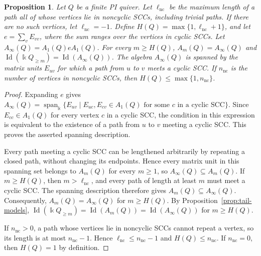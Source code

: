 \documentclass[11pt,reqno]{amsart}
\newcommand{\kk}{\Bbbk}
\newcommand{\Id}{\operatorname{Id}}
\newtheorem{proposition}[theorem]{Proposition}
\theoremstyle{definition}
\theoremstyle{remark}
\numberwithin{equation}{section}
\begin{document}
\begin{proposition}\label{prop:tail-stabilization}
Let $Q$ be a finite PI quiver. Let $\ell_{\mathrm{nc}}$ be the maximum
length of a path all of whose vertices lie in noncyclic SCCs,
including trivial paths. If there are no such vertices, let
$\ell_{\mathrm{nc}}=-1$. Define
$H(Q)=\max\{1,\ell_{\mathrm{nc}}+1\}$, and let
$e=\sum_{v}E_{vv}$, where the sum ranges over the vertices in cyclic
SCCs. Let $A_\infty(Q)=A_1(Q)eA_1(Q)$. For every $m\ge H(Q)$,
$
 A_m(Q)=A_\infty(Q)$ and $
 \Id(\kk Q_{\ge m})=\Id(A_\infty(Q))$.
The algebra $A_\infty(Q)$ is spanned by the matrix units $E_{uv}$
for which a path from $u$ to $v$ meets a cyclic SCC.
If $n_{\mathrm{nc}}$ is the number of vertices in noncyclic SCCs,
then $H(Q)\le\max\{1,n_{\mathrm{nc}}\}$.
\end{proposition}

\begin{proof}

Expanding $e$ gives
$
A_\infty(Q)=\operatorname{span}_{\kk}
\{E_{uv}\mid E_{uc},E_{cv}\in A_1(Q)
\text{ for some }c\text{ in a cyclic SCC}\}.
$
Since $E_{cc}\in A_1(Q)$ for every vertex $c$ in a cyclic SCC,
the condition in this expression is equivalent to the existence
of a path from $u$ to $v$ meeting a cyclic SCC.
This proves the asserted spanning description.


Every path meeting a cyclic SCC can be lengthened arbitrarily
by repeating a closed path, without changing its endpoints.
Hence every matrix unit in this spanning set belongs to
$A_m(Q)$ for every $m\ge1$, so $A_\infty(Q)\subseteq A_m(Q)$.
If $m\ge H(Q)$, then $m>\ell_{\mathrm{nc}}$, and every path
of length at least $m$ must meet a cyclic SCC.
The spanning description therefore gives
$A_m(Q)\subseteq A_\infty(Q)$.
Consequently, $A_m(Q)=A_\infty(Q)$ for $m\ge H(Q)$.
By Proposition~\ref{prop:tail-models},
$\Id(\kk Q_{\ge m})=\Id(A_m(Q))=\Id(A_\infty(Q))$
for $m\ge H(Q)$.

If $n_{\mathrm{nc}}>0$, a path whose vertices lie in
noncyclic SCCs cannot repeat a vertex, so its length is
at most $n_{\mathrm{nc}}-1$.
Hence $\ell_{\mathrm{nc}}\le n_{\mathrm{nc}}-1$ and
$H(Q)\le n_{\mathrm{nc}}$.
If $n_{\mathrm{nc}}=0$, then $H(Q)=1$ by definition.
\end{proof}
\end{document}
